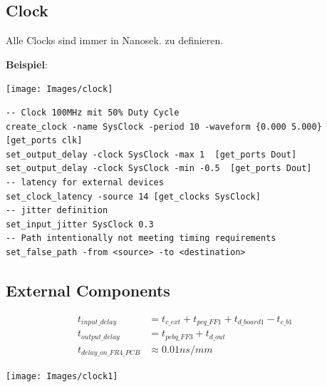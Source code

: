 \subsection{Clock}
Alle Clocks sind immer in Nanosek. zu definieren.

\textbf{Beispiel}:
\begin{center}
	\texttt{[image: Images/clock]}
\end{center}

\begin{lstlisting}
-- Clock 100MHz mit 50% Duty Cycle
create_clock -name SysClock -period 10 -waveform {0.000 5.000} [get_ports clk]
set_output_delay -clock SysClock -max 1  [get_ports Dout]
set_output_delay -clock SysClock -min -0.5  [get_ports Dout]
-- latency for external devices
set_clock_latency -source 14 [get_clocks SysClock]
-- jitter definition
set_input_jitter SysClock 0.3
-- Path intentionally not meeting timing requirements
set_false_path -from <source> -to <destination>
\end{lstlisting}


\subsection{External Components}
\begin{align*}
	t_{input\_delay} &= t_{c\_ext} + t_{pcq\_FF1} + t_{d\_board1} - t_{c\_b1} \\
	t_{output\_delay} &= t_{pcbq\_FF3} + t_{d\_out} \\
	t_{delay\_on\_FR4\_PCB} &\approx 0.01 \unit{ns/mm}
\end{align*}
	
\begin{center}
	\texttt{[image: Images/clock1]}
\end{center}
